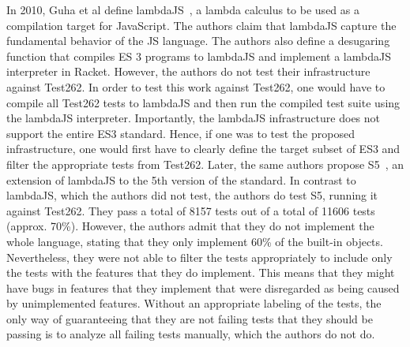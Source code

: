 \documentclass[runningheads]{llncs}
\begin{document}
In 2010, Guha et al define lambdaJS~\cite{essence_javascript-2010}, a lambda calculus to be used as a compilation target for JavaScript. The authors claim that lambdaJS capture the fundamental behavior of the JS language. The authors also define a desugaring function that compiles ES 3 programs to lambdaJS and implement a lambdaJS interpreter in Racket. However, the authors do not test their infrastructure against Test262. In order to test this work against Test262, one would have to compile all Test262 tests to lambdaJS and then run the compiled test suite using the lambdaJS interpreter. Importantly, the lambdaJS infrastructure does not support the entire ES3 standard. Hence, if one was to test the proposed infrastructure, one would first have to clearly define the target subset of ES3 and filter the appropriate tests from Test262. Later, the same authors propose S5~\cite{Politz-2012}, an extension of lambdaJS to the 5th version of the standard. In contrast to lambdaJS, which the authors did not test, the authors do test S5, running it against Test262. They pass a total of 8157 tests out of a total of 11606 tests (approx. 70\%). However, the authors admit that they do not implement the whole language, stating that they only implement 60\% of the built-in objects. Nevertheless, they were not able to filter the tests appropriately to include only the tests with the features that they do implement. This means that they might have bugs in features that they implement that were disregarded as being caused by unimplemented features. Without an appropriate labeling of the tests, the only way of guaranteeing that they are not failing tests that they should be passing is to analyze all failing tests manually, which the authors do not do. 
\end{document}
